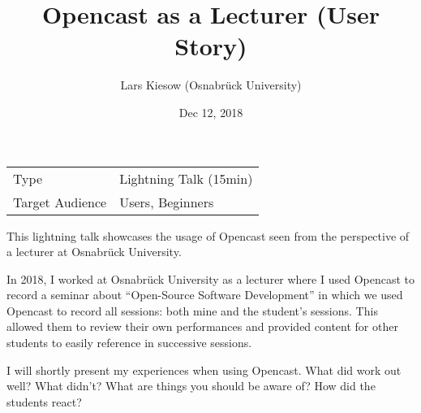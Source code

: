 \documentclass[a4paper]{article}
\title{Opencast as a Lecturer (User Story)}
\date{Dec 12, 2018}
\author{Lars Kiesow (Osnabrück University)}
\begin{document}
\maketitle

\begin{center}
\begin{tabular}{ll}
\toprule
	Type            & Lightning Talk (15min) \\
	Target Audience & Users, Beginners \\
\bottomrule
\end{tabular}
\end{center}

\vspace{1em}

This lightning talk showcases the usage of Opencast seen from the perspective
of a lecturer at Osnabrück University.

In 2018, I worked at Osnabrück University as a lecturer where I used Opencast
to record a seminar about “Open-Source Software Development” in which we used
Opencast to record all sessions: both mine and the student's sessions. This
allowed them to review their own performances and provided content for other
students to easily reference in successive sessions.

I will shortly present my experiences when using Opencast. What did work out
well? What didn't? What are things you should be aware of? How did the students
react?
\end{document}
